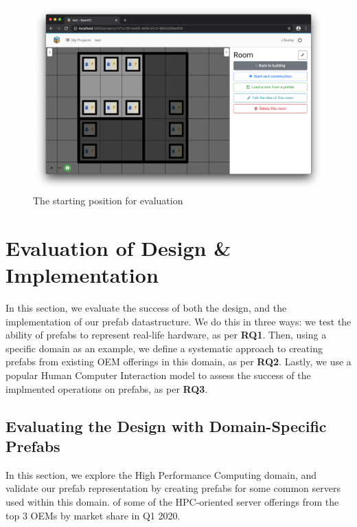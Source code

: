 \documentclass[11pt]{article}
\begin{document}
\begin{figure}[]
	\centering
	\includegraphics[width=\textwidth]{frontendstartingpoint.png}
	\caption[The starting position for evaluation]{The starting position for evaluation}
	\label{fig:evalstart}
\end{figure}

\section{Evaluation of Design \& Implementation} \label{sec:evaluation}
	In this section, we evaluate the success of both the design, and the implementation of our prefab datastructure.
	We do this in three ways: we test the ability of prefabs to represent real-life hardware, as per \textbf{RQ1}.
	Then, using a specific domain as an example, we define a systematic approach to creating prefabs from existing OEM offerings in this domain, as per \textbf{RQ2}.
	Lastly, we use a popular Human Computer Interaction model to assess the success of the implmented operations on prefabs, as per \textbf{RQ3}.

	\subsection{Evaluating the Design with Domain-Specific Prefabs}
		In this section, we explore the High Performance Computing domain, and validate our prefab representation by creating prefabs for some common servers used within this domain. of some of the HPC-oriented server offerings from the top 3 OEMs by market share in Q1 2020.
	
\end{document}
